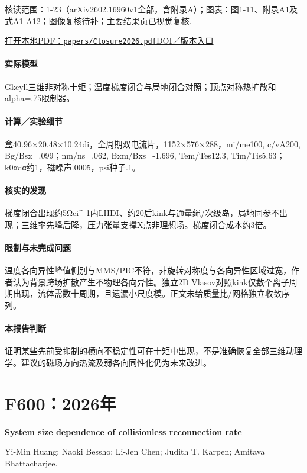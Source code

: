 \textsf{核读范围：}1-23（arXiv2602.16960v1全部，含附录A）；\textsf{图表：}图1-11、附录A1及式A1-A12；图像复核待补；主要结果页已视觉复核.

\href{run:papers/Closure2026.pdf}{打开本地PDF：\texttt{papers/Closure2026.pdf}}\quad\href{https://doi.org/10.1029/2026ja035250}{DOI／版本入口}

\paragraph{实际模型}Gkeyll三维非对称十矩；温度梯度闭合与局地闭合对照；顶点对称热扩散和alpha=.75限制器。

\paragraph{计算／实验细节}盒40.96×20.48×10.24di，全周期双电流片，1152×576×288，mi/me100, c/vA200, Bg/Bsx=.099；nm/ns=.062, Bxm/Bxs=-1.696, Tem/Tes12.3, Tim/Tis5.63；k0αdα约1，磁噪声.0005，psi种子.1。

\paragraph{核实的发现}梯度闭合出现约5Ωci\textasciicircum{}-1内LHDI、约20后kink与通量绳/次级岛，局地同参不出现；三维率先峰后降，压力张量支撑X点非理想场。梯度闭合成本约3倍。

\paragraph{限制与未完成问题}温度各向异性峰值侧别与MMS/PIC不符，非旋转对称度与各向异性区域过宽，作者认为背景跨场扩散产生不物理各向异性。独立2D Vlasov对照kink仅数个离子周期出现，流体需数十周期，且遗漏小尺度模。正文未给质量比/网格独立收敛序列。

\paragraph{本报告判断}证明某些先前受抑制的横向不稳定性可在十矩中出现，不是准确恢复全部三维动理学。建议的磁场方向热流及弱各向同性化仍为未来改进。

\section{F600：2026年}\label{paper:F600}

\textbf{System size dependence of collisionless reconnection rate}\citep{F600}\

Yi-Min Huang;  Naoki Bessho;  Li-Jen Chen;  Judith T. Karpen;  Amitava Bhattacharjee.

